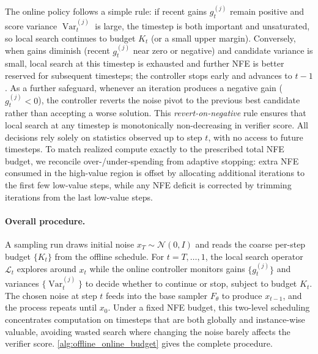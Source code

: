 The online policy follows a simple rule:
if recent gains $g_t^{(j)}$ remain positive and score variance
$\operatorname{Var}_t^{(j)}$ is large, the timestep is both important
and unsaturated, so local search continues to budget $K_t$ (or a small upper margin).
Conversely, when gains diminish (recent $g_t^{(j)}$ near
zero or negative) and candidate variance is small, local
search at this timestep is exhausted and further NFE is better reserved
for subsequent timesteps; the controller stops early and advances to $t-1$.
As a further safeguard, whenever an iteration produces a negative gain
($g_t^{(j)} < 0$), the controller reverts the noise pivot to the
previous best candidate rather than accepting a worse solution.
This \emph{revert-on-negative} rule ensures that local search at any
timestep is monotonically non-decreasing in verifier score.
All decisions rely solely on statistics observed up to step
$t$, with no access to future timesteps.
To match realized compute exactly to the prescribed total NFE budget,
we reconcile over-/under-spending from adaptive stopping:
extra NFE consumed in the high-value region is offset by allocating
additional iterations to the first few low-value steps, while any NFE deficit
is corrected by trimming iterations from the last low-value steps.

\paragraph{Overall procedure.}
A sampling run draws initial noise $x_T \sim \mathcal{N}(0, I)$ and
reads the coarse per-step budget $\{K_t\}$ from the offline schedule.
For $t = T, \dots, 1$, the local search operator
$\mathcal{L}_t$ explores around $x_t$ while the online controller
monitors gains $\{g_t^{(j)}\}$ and variances
$\{\operatorname{Var}_t^{(j)}\}$ to decide whether to continue or stop,
subject to budget $K_t$.
The chosen noise at step $t$ feeds into the base sampler
$F_\theta$ to produce $x_{t-1}$, and the process repeats until $x_0$.
Under a fixed NFE budget, this two-level scheduling concentrates
computation on timesteps that are both globally and instance-wise valuable,
avoiding wasted search where changing the noise barely affects
the verifier score.
\cref{alg:offline_online_budget} gives the complete procedure.

